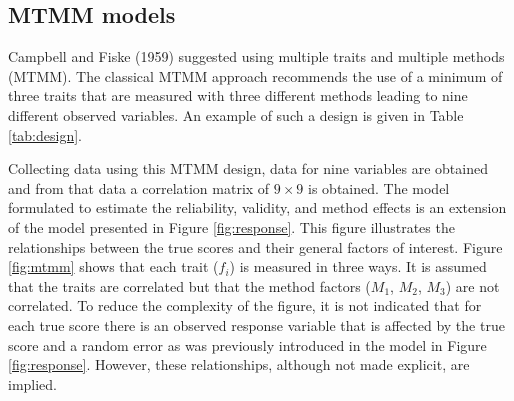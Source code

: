 \documentclass[a4paper,12pt]{article}
\begin{document}
\subsection{MTMM models}

Campbell and Fiske (1959) suggested using multiple traits and multiple methods (MTMM). The classical MTMM approach recommends the use of a minimum of three traits that are measured with three different methods leading to nine different observed variables. An example of such a design is given in Table \ref{tab:design}.  

\begin{table}[htb]\caption{The classic MTMM design used in the ESS pilot study.\label{tab:design}}
\end{table}

Collecting data using this MTMM design, data for nine variables are obtained and from that data a correlation matrix of $9 \times 9$ is obtained. The model formulated to estimate the reliability, validity, and method effects is an extension of the model presented in Figure \ref{fig:response}. This figure illustrates the relationships between the true scores and their general factors of interest. Figure \ref{fig:mtmm} shows that each trait ($f_i$) is measured in three ways. It is assumed that the traits are correlated but that the method factors ($M_1$, $M_2$, $M_3$) are not correlated. To reduce the complexity of the figure, it is not indicated that for each true score there is an observed response variable that is affected by the true score and a random error as was previously introduced in the model in Figure \ref{fig:response}. However, these relationships, although not made explicit, are implied.  
\end{document}
